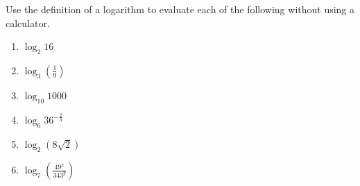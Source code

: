 Use the definition of a logarithm to evaluate each of the following without using a calculator.  

\begin{enumerate}
\item   $\displaystyle \log_2 16$

\item   $\displaystyle\log_3 \left(\frac{1}{9}\right)$

\item   $\displaystyle\log_{10} 1000$

\item   $\displaystyle\log_{6} 36^{-\frac{2}{3}}$

\item   $\displaystyle\log_{2} (8\sqrt{2})$

\item   $\displaystyle \log_7\left(\frac{49^x}{343^y}\right)$

\solution{%
\[
\begin{array}{rcl}
\log_7\left(\frac{49^x}{343^y}\right) & =& \log_749^x - \log_7343^y \\
 & =& x\log_749 - y\log_7343 \\
\text{But }49 = 7^2\text{ and }343=7^3,\text{ therefore }
\log_7\left(\frac{49^x}{343^y}\right) & =& 2x-3y.
\end{array}
\]
}%


\end{enumerate}
